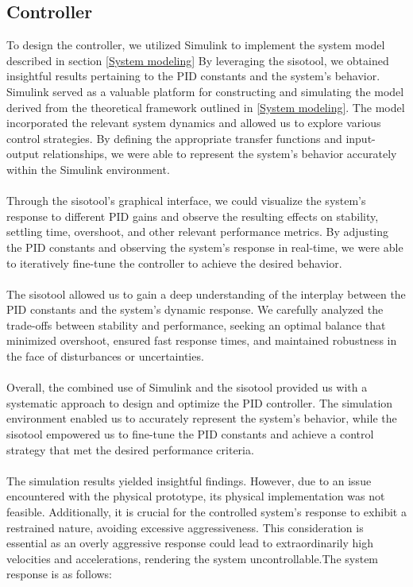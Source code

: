 \subsection{Controller}

To design the controller, we utilized Simulink to implement the system model described in section \ref{System modeling} By leveraging the sisotool, we obtained insightful results pertaining to the PID constants and the system's behavior. Simulink served as a valuable platform for constructing and simulating the model derived from the theoretical framework outlined in \ref{System modeling}. The model incorporated the relevant system dynamics and allowed us to explore various control strategies. By defining the appropriate transfer functions and input-output relationships, we were able to represent the system's behavior accurately within the Simulink environment.
\\\\
Through the sisotool's graphical interface, we could visualize the system's response to different PID gains and observe the resulting effects on stability, settling time, overshoot, and other relevant performance metrics. By adjusting the PID constants and observing the system's response in real-time, we were able to iteratively fine-tune the controller to achieve the desired behavior.
\\\\
The sisotool allowed us to gain a deep understanding of the interplay between the PID constants and the system's dynamic response. We carefully analyzed the trade-offs between stability and performance, seeking an optimal balance that minimized overshoot, ensured fast response times, and maintained robustness in the face of disturbances or uncertainties.
\\\\
Overall, the combined use of Simulink and the sisotool provided us with a systematic approach to design and optimize the PID controller. The simulation environment enabled us to accurately represent the system's behavior, while the sisotool empowered us to fine-tune the PID constants and achieve a control strategy that met the desired performance criteria.
\\\\
The simulation results yielded insightful findings. However, due to an issue encountered with the physical prototype, its physical implementation was not feasible. Additionally, it is crucial for the controlled system's response to exhibit a restrained nature, avoiding excessive aggressiveness. This consideration is essential as an overly aggressive response could lead to extraordinarily high velocities and accelerations, rendering the system uncontrollable.The system response is as follows:
